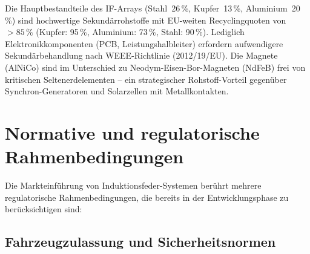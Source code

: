 ﻿\documentclass[12pt, a4paper]{report}
\theoremstyle{definition}
\theoremstyle{remark}
\begin{document}
Die Hauptbestandteile des IF-Arrays (Stahl~26\,\%, Kupfer~13\,\%,
Aluminium~20\,\%) sind hochwertige Sekundärrohstoffe mit EU-weiten
Recyclingquoten von $> 85\,\%$ (Kupfer: 95\,\%, Aluminium: 73\,\%,
Stahl: 90\,\%). Lediglich Elektronikkomponenten (PCB, Leistungshalbleiter)
erfordern aufwendigere Sekundärbehandlung nach WEEE-Richtlinie (2012/19/EU).
Die Magnete (AlNiCo) sind im Unterschied zu Neodym-Eisen-Bor-Magneten
(NdFeB) frei von kritischen Seltenerdelementen -- ein strategischer
Rohstoff-Vorteil gegenüber Synchron-Generatoren und Solarzellen mit
Metallkontakten.

\section{Normative und regulatorische Rahmenbedingungen}
\label{sec:normativ}

Die Markteinführung von Induktionsfeder-Systemen berührt mehrere
regulatorische Rahmenbedingungen, die bereits in der Entwicklungsphase
zu berücksichtigen sind:

\subsection{Fahrzeugzulassung und Sicherheitsnormen}
\end{document}
